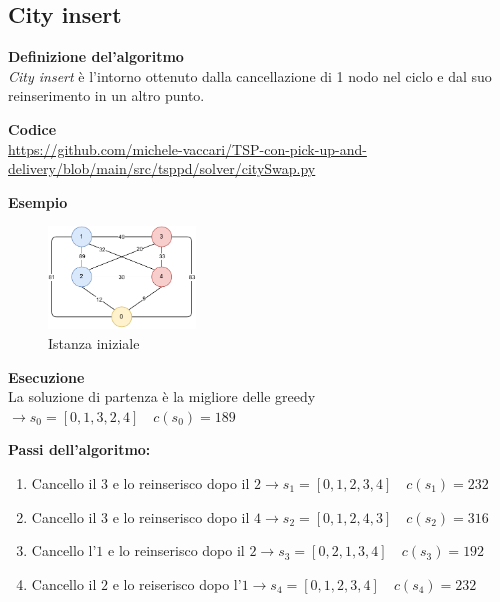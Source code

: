 \documentclass[9pt]{beamer}
\begin{document}
\subsection{City insert}
\begin{frame}{\subsecname}
	\textbf{Definizione del'algoritmo} \\
	\emph{City insert} è l’intorno ottenuto dalla cancellazione di 1 nodo nel ciclo e dal suo reinserimento in un altro punto.

	\textbf{Codice} \\
	\href{https://github.com/michele-vaccari/TSP-con-pick-up-and-delivery/blob/main/src/tsppd/solver/citySwap.py}{https://github.com/michele-vaccari/TSP-con-pick-up-and-delivery/blob/main/src/tsppd/solver/citySwap.py}

	\textbf{Esempio}
	\begin{figure}[h]
	\centering
	\includegraphics[width=0.35\textwidth]
	{../images/graph-tsppd-with-two-customers}	
	\caption{Istanza iniziale}
	\end{figure}

\framebreak
	{\footnotesize
	\textbf{Esecuzione} \\
	La soluzione di partenza è la migliore delle greedy $\rightarrow s_0 = [0,1,3,2,4] \quad c(s_0) = 189$

	\textbf{Passi dell’algoritmo:}
	\begin{enumerate}
		\item
		\label{city-insert-case}
		Cancello il $3$ e lo reinserisco dopo il $2 \rightarrow s_1 = [0,1,2,3,4] \quad c(s_1) = 232$
		\item
		Cancello il $3$ e lo reinserisco dopo il $4 \rightarrow s_2 = [0,1,2,4,3] \quad c(s_2) = 316$
		\item
		Cancello l’$1$ e lo reinserisco dopo il $2 \rightarrow s_3 = [0,2,1,3,4] \quad c(s_3) = 192$
		\item
		Cancello il $2$ e lo reiserisco dopo l’$1 \rightarrow s_4 = [0,1,2,3,4] \quad c(s_4) = 232$
	\end{enumerate}

	\captionsetup{justification=centering,font=footnotesize}

}
\end{frame}
\end{document}

